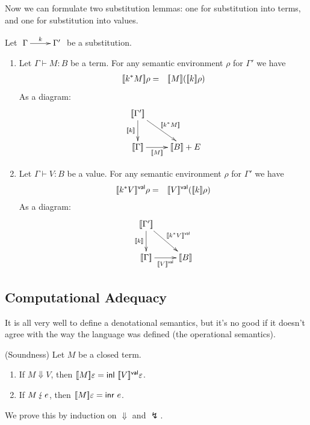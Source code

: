 \documentclass[runningheads,12pt]{llncs}
\begin{document}
Now we can formulate two substitution lemmas: one for substitution into terms, and one for substitution into values.
\begin{lemma}
  Let $\amorphism{k}{\Gamma}{\Gamma'}$ be a substitution. 
  \begin{enumerate}
  \item Let $\Gamma \vdash M : B$ be a term.  \newline For any semantic environment $\rho$ for $\Gamma'$ we have
    \begin{eqnarray*}
[\![ {k^{*}M} ]\!] \rho  & = & [\![ {M} ]\!]([\![ {k} ]\!]\rho)
\end{eqnarray*}
As a diagram:
    \begin{displaymath}
\xymatrix{
      \seman{\Gamma'} \ar[d]_{\seman{k}} \ar[dr]^{\seman{k^*M}} & \\
      \seman{\Gamma} \ar[r]_-{\seman{M}} & \seman{B} + E \\
}
    \end{displaymath}
\item Let $\Gamma \vdash V : B$ be a value.  \newline For any semantic environment $\rho$ for $\Gamma'$ we have 
  \begin{eqnarray*}
[\![ {k^{*}V} ]\!]^{\mathsf{val}} \rho & = & [\![ {V} ]\!]^{\mathsf{val}}([\![ {k} ]\!]\rho)
\end{eqnarray*}
As a diagram:
    \begin{displaymath}
\xymatrix{
      \seman{\Gamma'} \ar[d]_{\seman{k}} \ar[dr]^{\semanval{k^*V}} & \\
      \seman{\Gamma} \ar[r]_-{\semanval{V}} & \seman{B} \\
}
    \end{displaymath}
  \end{enumerate}
\end{lemma}


\subsection{Computational Adequacy}

It is all very well to define a denotational semantics, but it's no good if it doesn't agree with the way the language was defined (the operational semantics).
\begin{proposition} (Soundness)
  Let $M$ be a closed term.
  \begin{enumerate}
  \item \label{item:sound} If $M \Downarrow V$, then $[\![ {M} ]\!]\varepsilon = \mathsf{inl} \  [\![ {V} ]\!]^{\mathsf{val}}\varepsilon$.
  \item \label{item:adeq} If $M \,\lightning\, e$, then $[\![ {M} ]\!]\varepsilon = \mathsf{inr} \  e$. 
  \end{enumerate}
\end{proposition}
We prove this by induction on $\Downarrow$ and $\lightning$. 
\end{document}
